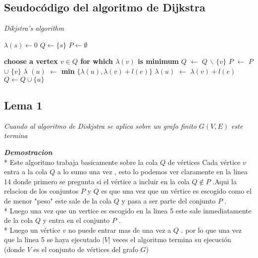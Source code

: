 \documentclass[10pt]{article}
\begin{document}
    \subsection{Seudoc\'odigo del algoritmo de Dijkstra} 

        \begin{algorithm}[H]
            \caption{\textit{Dikjstra's algorithm}}
            \begin{algorithmic}[1]      
            \State $\lambda \left(s \right) \leftarrow 0 $
            \State $Q \leftarrow \{s\}$
            \State $P \leftarrow \emptyset $

                    \State \textbf{choose a vertex $v \in Q $ for which $\lambda \left(v\right)$ is minimum}
                    \State $Q$ $\leftarrow$ $Q$ $\backslash$ $\{v\}$
                    \State $P$ $\leftarrow$ $P$ $\cup$  $\{v\}$
                            \State $\lambda $ $\left(u\right)$ $\leftarrow $ \textbf{min} $\{ \lambda \left(u\right) , \lambda \left(v\right) + l \left(e\right)\}$ 
                        \Else
                                \State $\lambda\left(u\right)$ $ \leftarrow $ $ \lambda \left(v\right) + l \left(e\right)$
                                \State $ Q \leftarrow  Q \cup \{u\}$
                            \EndIf
                        \EndIf 
                    \EndFor
            \EndWhile 
            \end{algorithmic}
        \end{algorithm}

    
    \subsection*{Lema 1}
        \noindent  \textit{Cuando al algoritmo de Diskjstra se aplica sobre un grafo finito $G\left(V,E\right)$ este termina} 

        \vspace{0.5cm} 
        \noindent \textit{\textbf{Demostracion } }
        \\*
        \noindent Este algoritmo trabaja basicamente sobre la cola $Q$ de v\'ertices 
        Cada v\'ertice $v$ entra a la cola $Q$ a lo sumo una vez , esto lo podemos ver claramente en la linea 14 donde primero se pregunta si el v\'ertice a incluir en 
        la cola $Q \notin P $ .Aqui la relacion de los conjuntos $P$ y $Q$ es que una vez que un v\'ertice es escogido como el de menor "peso" este sale de la cola 
        $Q$ y pasa a ser parte del conjunto $P$ . 
        \\*
        Luego una vez que un vertice es escogido en la linea 5 este sale inmediatamente de la cola $Q$ y entra en el conjunto $P$ . 
        \\*
        Luego un v\'ertice $v$ no puede entrar mas de una vez a $Q$ . por lo que una vez que la linea 5 se haya ejecutado $|V|$ veces el algoritmo termina su ejecuci\'on (donde $V$  es el conjunto de v\'ertices del grafo $G$)
    
\end{document}
